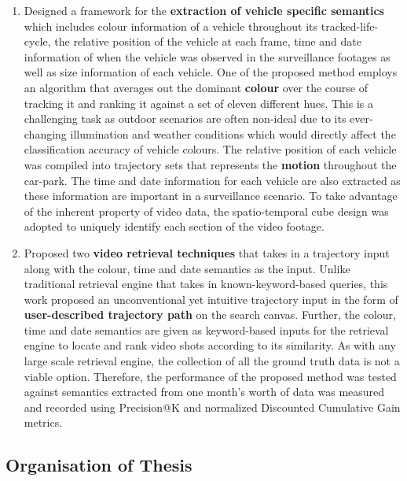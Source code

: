 \begin{enumerate}
\item Designed a framework for the \textbf{extraction of vehicle specific semantics} which includes colour information of a vehicle throughout its tracked-life-cycle, the relative position of the vehicle at each frame, time and date information of when the vehicle was observed in the surveillance footages as well as size information of each vehicle. One of the proposed method employs an algorithm that averages out the dominant \textbf{colour} over the course of tracking it and ranking it against a set of eleven different hues. This is a challenging task as outdoor scenarios are often non-ideal due to its ever-changing illumination and weather conditions which would directly affect the classification accuracy of vehicle colours. The relative position of each vehicle was compiled into trajectory sets that represents the \textbf{motion} throughout the car-park. The time and date information for each vehicle are also extracted as these information are important in a surveillance scenario. To take advantage of the inherent property of video data, the spatio-temporal cube design was adopted to uniquely identify each section of the video footage.
\item Proposed two \textbf{video retrieval techniques} that takes in a trajectory input along with the colour, time and date semantics as the input. Unlike traditional retrieval engine that takes in known-keyword-based queries, this work proposed an unconventional yet intuitive trajectory input in the form of \textbf{user-described trajectory path} on the search canvas. Further, the colour, time and date semantics are given as keyword-based inputs for the retrieval engine to locate and rank video shots according to its similarity. As with any large scale retrieval engine, the collection of all the ground truth data is not a viable option. Therefore, the performance of the proposed method was tested against semantics extracted from one month's worth of data was measured and recorded using Precision@K and normalized Discounted Cumulative Gain metrics.
\end{enumerate}

\subsection{Organisation of Thesis}

